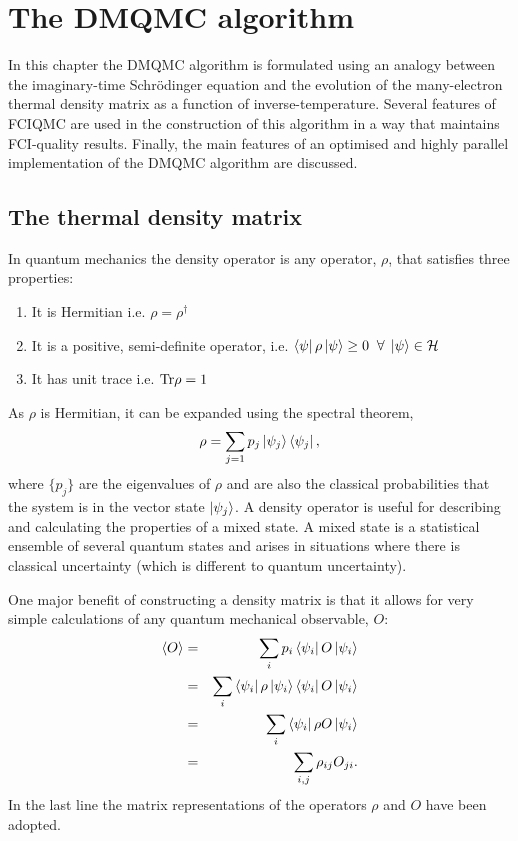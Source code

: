 \chapter{The DMQMC algorithm}
\label{ch:chapter1}
\ifpdf
    \graphicspath{{Chapter1/Chapter1Figs/PNG/}{Chapter1/Chapter1Figs/PDF/}{Chapter1/Chapter1Figs/}}
\else
    \graphicspath{{Chapter1/Chapter1Figs/EPS/}{Chapter1/Chapter1Figs/}}
\fi

In this chapter the DMQMC algorithm is formulated using an analogy between the imaginary-time Schr\"odinger equation and the evolution of the many-electron thermal density matrix as a function of inverse-temperature. Several features of FCIQMC are used in the construction of this algorithm in a way that maintains FCI-quality results. Finally, the main features of an optimised and highly parallel implementation of the DMQMC algorithm are discussed.

\section{The thermal density matrix}
\label{sec:DensityMatrix}

In quantum mechanics the density operator\cite{Isham} is any operator, $\rho$, that satisfies three properties:
\begin{enumerate}
\item It is Hermitian i.e. $\rho = \rho^{\dag}$
\item It is a positive, semi-definite operator, i.e. $\bra{\psi}\rho\ket{\psi} \geq 0\; \; \forall\; \ket{\psi}\in\mathcal{H}$ 
\item It has unit trace i.e. $\textnormal{Tr}\rho=1$
\end{enumerate}
As $\rho$ is Hermitian, it can be expanded using the spectral theorem,
\begin{equation}
\rho = \sum_{j=1}p_j\ket{\psi_j}\bra{\psi_j},
\end{equation}
where $\{p_j\}$ are the eigenvalues of $\rho$ and are also the classical probabilities that the system is in the vector state $\ket{\psi_j}$. A density operator is useful for describing and calculating the properties of a mixed state. A mixed state is a statistical ensemble of several quantum states and arises in situations where there is classical uncertainty (which is different to quantum uncertainty). 

One major benefit of constructing a density matrix is that it allows for very simple calculations of any quantum mechanical observable, $O$:
\begin{eqnarray}
\label{eq:estimator}
\langle O \rangle&=&\sum_i p_i\bra{\psi_i} O \ket{\psi_i}\nonumber\\
&=&\sum_i \bra{\psi_i}\rho\ket{\psi_i}\bra{\psi_i} O \ket{\psi_i}\nonumber\\
&=&\sum_i \bra{\psi_i}\rho O\ket{\psi_i}\nonumber\\
&=&\sum_{i,j}\rho_{ij} O_{ji}.
\end{eqnarray}
In the last line the matrix representations of the operators $\rho$ and $O$ have been adopted.


